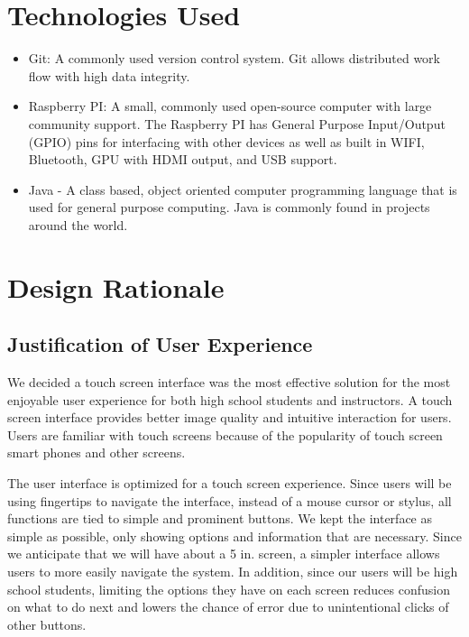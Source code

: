 \section{Technologies Used}
	\begin{itemize}
	\item Git: A commonly used version control system. Git allows distributed work flow with high data integrity.
	\item Raspberry PI: A small, commonly used open-source computer with large community support. The Raspberry PI has General Purpose Input/Output (GPIO) pins for interfacing with other devices as well as built in WIFI, Bluetooth, GPU with HDMI output, and USB support.
	\item Java - A class based, object oriented computer programming language that is used for general purpose computing. Java is commonly found in projects around the world.
	\end{itemize}


\section{Design Rationale}
\subsection{Justification of User Experience}

We decided a touch screen interface was the most effective solution for the most enjoyable user experience for both high school students and instructors. A touch screen interface provides better image quality and intuitive interaction for users. Users are familiar with touch screens because of the popularity of touch screen smart phones and other screens.

The user interface is optimized for a touch screen experience. Since users will be using fingertips to navigate the interface, instead of a mouse cursor or stylus, all functions are tied to simple and prominent buttons. We kept the interface as simple as possible, only showing options and information that are necessary. Since we anticipate that we will have about a 5 in. screen, a simpler interface allows users to more easily navigate the system. In addition, since our users will be high school students, limiting the options they have on each screen reduces confusion on what to do next and lowers the chance of error due to unintentional clicks of other buttons.

